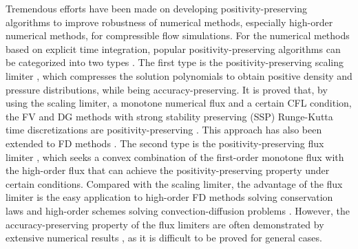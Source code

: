 Tremendous efforts have been made on developing positivity-preserving algorithms to improve robustness of numerical methods,
especially high-order numerical methods, for compressible flow simulations.
For the numerical methods based on explicit time integration, popular positivity-preserving
algorithms can be categorized into two types \cite{xu2017bound}.
The first type is the positivity-preserving scaling limiter \cite{zhang2010maximum,zhang2010positivity},
which compresses the solution polynomials to obtain positive density and pressure distributions,
while being accuracy-preserving.
It is proved that, by using the scaling limiter,
a monotone numerical flux and a certain CFL condition,
the FV and DG methods with strong stability preserving (SSP) Runge-Kutta
time discretizations are positivity-preserving \cite{zhang2010positivity}.
This approach has also been extended to FD methods \cite{zhang2012positivity,fan2022positivity}.
The second type is the positivity-preserving flux limiter \cite{hu2013positivity,christlieb2015high,kuzmin2022bound},
which seeks a convex combination of the first-order monotone flux with the high-order flux that
can achieve the positivity-preserving property under certain conditions. Compared with the scaling limiter,
the advantage of the flux limiter is the easy application to high-order FD methods solving conservation laws and high-order schemes
solving convection-diffusion problems \cite{xu2017bound}.
However, the accuracy-preserving property of the flux limiters are often demonstrated
by extensive numerical results \cite{xiong2013parametrized},
as it is difficult to be proved for general cases.

